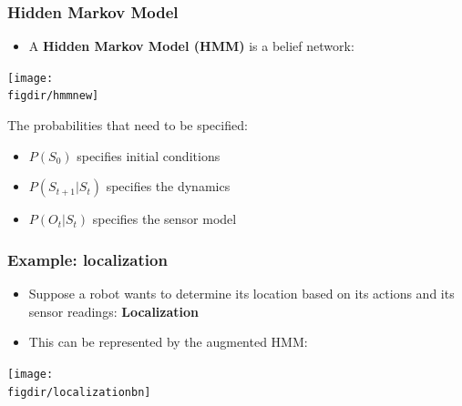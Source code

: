 \documentclass[12pt]{beamer} %
\newcommand{\figdir}{../../figures/ch06}
\begin{document}
\begin{frame}
\frametitle{Hidden Markov Model}
\begin{itemize}
\item
A \textbf{Hidden Markov Model (HMM)} is a belief network:
\end{itemize}
\begin{center}
\texttt{[image: \\figdir/hmmnew]}
\end{center}
The probabilities that need to be specified:\pause
\begin{itemize}
\item $P(S_0)$ specifies initial conditions
\item $P(S_{t+1}|S_t)$ specifies the dynamics
\item $P(O_t|S_t)$ specifies the sensor model
\end{itemize}
\end{frame}



\begin{frame}
\frametitle{Example: localization}
\begin{itemize}
\item Suppose a robot wants to determine its location based on its
actions and its sensor readings: \textbf{Localization}
\item This can be represented by the augmented HMM:
\end{itemize}
\begin{center}
\texttt{[image: \\figdir/localizationbn]}
\end{center}

\end{frame}
\end{document}
